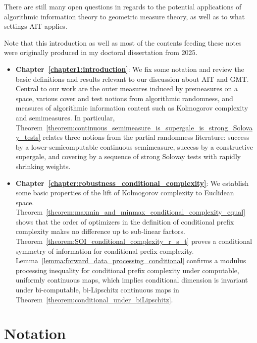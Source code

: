 There are still many open questions in regards to the potential applications of algorithmic information theory to geometric measure theory, as well as to what settings AIT applies. 

Note that this introduction as well as most of the contents feeding these notes were originally produced in my doctoral dissertation from 2025. 

\begin{itemize}
    \item \textbf{Chapter~\ref{chapter1:introduction}}: We fix some notation and review the basic definitions and results relevant to our discussion about AIT and GMT. Central to our work are the outer measures induced by premeasures on a space, various cover and test notions from algorithmic randomness, and measures of algorithmic information content such as Kolmogorov complexity and semimeasures. In particular, Theorem~\ref{theorem:continuous_semimeasure_is_supergale_is_strong_Solovay_tests} relates three notions from the partial randomness literature: success by a lower-semicomputable continuous semimeasure, success by a constructive supergale, and covering by a sequence of strong Solovay tests with rapidly shrinking weights.
    \item \textbf{Chapter~\ref{chapter:robustness_conditional_complexity}}: We establish some basic properties of the lift of Kolmogorov complexity to Euclidean space. Theorem~\ref{theorem:maxmin_and_minmax_conditional_complexity_equal} shows that the order of optimizers in the definition of conditional prefix complexity makes no difference up to sub-linear factors. Theorem~\ref{theorem:SOI_conditional_complexity_r_s_t} proves a conditional symmetry of information for conditional prefix complexity. Lemma~\ref{lemma:forward_data_processing_conditional} confirms a modulus processing inequality for conditional prefix complexity under computable, uniformly continuous maps, which implies conditional dimension is invariant under bi-computable, bi-Lipschitz continuous maps in Theorem~\ref{theorem:conditional_under_biLipschitz}.
\end{itemize}


\section{Notation} \label{section:Notation}


